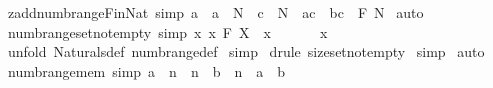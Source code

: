 \begin{isabellebody}
\ zadd{\isacharunderscore}numb{\isacharunderscore}range{\isacharunderscore}Fin{\isacharunderscore}Nat\ {\isacharbrackleft}simp{\isacharbrackright}{\isacharcolon}\ {\isachardoublequoteopen}{\isacharbang}{\isacharbang}a{\isachardot}\ {\isacharbrackleft}{\isacharbar}\ a\ {\isacharcolon}\ {\isacharpercent}N\ {\isacharsemicolon}\ c\ {\isacharcolon}\ {\isacharpercent}N{\isacharbar}{\isacharbrackright}\ {\isacharequal}{\isacharequal}{\isachargreater}\ {\isacharparenleft}a{\isacharplus}c\ {\isachardot}{\isachardot}\ b{\isacharplus}c{\isacharparenright}\ {\isacharcolon}\ {\isacharpercent}F\ {\isacharpercent}N{\isachardoublequoteclose}\isanewline
%
\isadelimproof
%
\endisadelimproof
%
\isatagproof
{}\isamarkupfalse%
\ auto\isanewline
{}\isamarkupfalse%
%
\endisatagproof
{\isafoldproof}%
%
\isadelimproof
\isanewline
%
\endisadelimproof
\isanewline
\isanewline
{}\isamarkupfalse%
\ numb{\isacharunderscore}range{\isacharunderscore}set{\isacharunderscore}notempty\ {\isacharbrackleft}simp{\isacharbrackright}{\isacharcolon}\ {\isachardoublequoteopen}{\isacharbang}{\isacharbang}x{\isachardot}\ {\isacharbrackleft}{\isacharbar}x{\isacharcolon}\ {\isacharpercent}F\ X\ {\isacharsemicolon}\ x\ {\isachartilde}{\isacharequal}\ {\isacharbraceleft}{\isacharbraceright}\ {\isacharbar}{\isacharbrackright}{\isacharequal}{\isacharequal}{\isachargreater}\ {\isacharparenleft}\ {}{\isacharcolon}\ {\isacharparenleft}\ {}{\isachardot}{\isachardot}{\isacharhash}x{\isacharparenright}{\isacharparenright}{\isachardoublequoteclose}\isanewline
%
\isadelimproof
%
\endisadelimproof
%
\isatagproof
{}\isamarkupfalse%
\ {\isacharparenleft}unfold\ Naturals{\isacharunderscore}def\ numb{\isacharunderscore}range{\isacharunderscore}def{\isacharparenright}\isanewline
{}\isamarkupfalse%
\ simp\isanewline
{}\isamarkupfalse%
\ {\isacharparenleft}drule\ size{\isacharunderscore}set{\isacharunderscore}notempty{\isacharparenright}\isanewline
{}\isamarkupfalse%
\ simp\isanewline
{}\isamarkupfalse%
\ auto\isanewline
{}\isamarkupfalse%
%
\endisatagproof
{\isafoldproof}%
%
\isadelimproof
\isanewline
%
\endisadelimproof
\isanewline
{}\isamarkupfalse%
\ numb{\isacharunderscore}range{\isacharunderscore}mem\ {\isacharbrackleft}simp{\isacharbrackright}{\isacharcolon}\ {\isachardoublequoteopen}{\isacharbrackleft}{\isacharbar}a\ {\isacharless}{\isacharequal}\ n\ {\isacharsemicolon}\ n\ {\isacharless}{\isacharequal}\ b{\isacharbar}{\isacharbrackright}\ {\isacharequal}{\isacharequal}{\isachargreater}\ n\ {\isacharcolon}\ {\isacharparenleft}a\ {\isachardot}{\isachardot}\ b{\isacharparenright}{\isachardoublequoteclose}\isanewline

\end{isabellebody}

